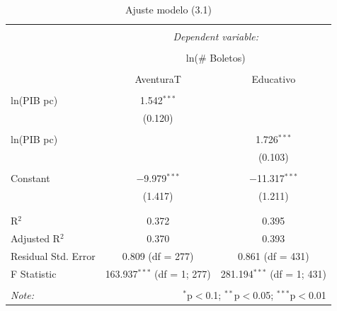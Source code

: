 \begin{table}[H] 
\centering 
  \caption{Ajuste modelo (3.1)} 
  \label{lm-log} 
\begin{tabular}{@{\extracolsep{5pt}}lcc} 
\\[-1.8ex]\hline 
\hline \\[-1.8ex] 
 & \multicolumn{2}{c}{\textit{Dependent variable:}} \\ 
\cline{2-3} 
\\[-1.8ex] & \multicolumn{2}{c}{ln(\# Boletos)} \\ 
\\[-1.8ex] & AventuraT & Educativo\\ 
\hline \\[-1.8ex] 
 ln(PIB pc) & 1.542$^{***}$ &  \\ 
  & (0.120) &  \\ 
  & & \\ 
 ln(PIB pc) &  & 1.726$^{***}$ \\ 
  &  & (0.103) \\ 
  & & \\ 
 Constant & $-$9.979$^{***}$ & $-$11.317$^{***}$ \\ 
  & (1.417) & (1.211) \\ 
  & & \\ 
\hline \\[-1.8ex] 
R$^{2}$ & 0.372 & 0.395 \\ 
Adjusted R$^{2}$ & 0.370 & 0.393 \\ 
Residual Std. Error & 0.809 (df = 277) & 0.861 (df = 431) \\ 
F Statistic & 163.937$^{***}$ (df = 1; 277) & 281.194$^{***}$ (df = 1; 431) \\ 
\hline 
\hline \\[-1.8ex] 
\textit{Note:}  & \multicolumn{2}{r}{$^{*}$p$<$0.1; $^{**}$p$<$0.05; $^{***}$p$<$0.01} \\ 
\end{tabular} 
\end{table}


